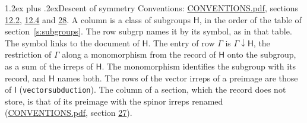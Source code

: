 \documentclass[10pt,a4paper]{article}
\makeatletter
\renewcommand\section{\@startsection{section}{1}{\z@}{-3ex plus -1ex minus -.2ex}%
  {1.2ex plus .2ex}{\normalfont\large\sffamily\bfseries\color{parttitle}}}
\numberwithin{equation}{section}
\newcommand{\grp}[1]{\mathsf{#1}}
\newcommand{\restr}[2]{#1\!\downarrow#2}
\makeatother
\begin{document}
\section{Descent of symmetry}\label{s:subduction}
Conventions: \href{../../CONVENTIONS.pdf}{CONVENTIONS.pdf}, sections \href{../../../rotation/CONVENTIONS.pdf\#conv.12.2}{12.2}, \href{../../../rotation/CONVENTIONS.pdf\#conv.12.4}{12.4} and \href{../../CONVENTIONS.pdf\#conv.28}{28}.
A column is a class of subgroups $\grp{H}$, in the order of the table of section~\ref{s:subgroups}. The row subgrp names it by its symbol, as in that table. The symbol links to the document of $\grp{H}$. The entry of row $\Gamma$ is $\restr{\Gamma}{\grp{H}}$, the restriction of $\Gamma$ along a monomorphism from the record of $\grp{H}$ onto the subgroup, as a sum of the irreps of $\grp{H}$. The monomorphism identifies the subgroup with its record, and $\grp{H}$ names both. The rows of the vector irreps of a preimage are those of \href{../../../rotation/data/pdf/I.pdf}{$\grp{I}$} (\texttt{vectorsubduction}). The column of a section, which the record does not store, is that of its preimage with the spinor irreps renamed (\href{../../CONVENTIONS.pdf}{CONVENTIONS.pdf}, section \href{../../CONVENTIONS.pdf\#conv.27}{27}).
\end{document}
